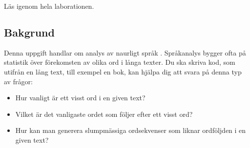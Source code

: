 


\Lab{\LabWeekSEVEN}
\begin{Goals}

\end{Goals}

\begin{Preparations}
\item {} 
\item Läs igenom hela laborationen.
\end{Preparations}


\subsection{Bakgrund}

Denna uppgift handlar om analys av naurligt språk . Språkanalys bygger ofta på statistik över förekomsten av olika ord i långa texter. Du ska skriva kod, som utifrån en lång text, till exempel en bok, kan hjälpa dig att svara på denna typ av frågor: 
\begin{itemize} 
\item Hur vanligt är ett visst ord i en given text?
\item Vilket är det vanligaste ordet som följer efter ett visst ord?
\item Hur kan man generera slumpmässiga ordsekvenser som liknar ordföljden i en given text?
\end{itemize}

